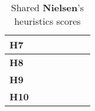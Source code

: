 \begin{table}[htp!]
\begin{tabular}{ |l|c|c|c|c|c|c| }
        \hline
        \textbf{H7} & \textbf{\color{unicefOrange}{3}} & \textbf{\color{unicefOrange}{3}} & \textbf{\color{unicefOrange}{3.5}} & \textbf{\color{unicefRed}{2}} & \textbf{\color{unicefRed}{2.875}} & \textbf{\color{unicefOrange}{3}}\\
        \hline
        \textbf{H8} & \textbf{\color{unicefGreen}{4}} & \textbf{\color{unicefOrange}{3}} & \textbf{\color{unicefGreen}{4}} & \textbf{\color{unicefGreen}{4}} & \textbf{\color{unicefOrange}{3.75}} & \textbf{\color{unicefGreen}{4}}\\
        \hline
        \textbf{H9} & \textbf{\color{unicefGreen}{4}} & \textbf{\color{unicefGray}{n.a}} & \textbf{\color{unicefGreen}{4.5}} & \textbf{\color{unicefGreen}{5}} & \textbf{\color{unicefGreen}{4.5}} & \textbf{\color{unicefGreen}{4}}\\
        \hline
        \textbf{H10} & \textbf{\color{unicefGreen}{5}} & \textbf{\color{unicefGreen}{4}} & \textbf{\color{unicefGreen}{4}} & \textbf{\color{unicefGray}{n.a}} & \textbf{\color{unicefGreen}{4.333}} & \textbf{\color{unicefGreen}{4.5}}\\
        \hline
    \end{tabular}
    \caption{Shared \textbf{Nielsen}'s heuristics scores}
\end{table}

